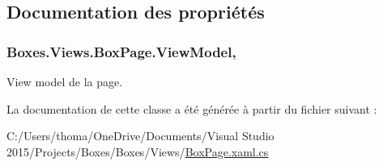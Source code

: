 \subsection{Documentation des propriétés}
\subsubsection[{\texorpdfstring{View\+Model}{ViewModel}}]{ Boxes.\+Views.\+Box\+Page.\+View\+Model\hspace{0.3cm}{\ttfamily [get]}, {\ttfamily [private]}}\hypertarget{class_boxes_1_1_views_1_1_box_page_a43f1ae61e2816252cebc7747a2a350c4}{}\label{class_boxes_1_1_views_1_1_box_page_a43f1ae61e2816252cebc7747a2a350c4}


View model de la page. 



La documentation de cette classe a été générée à partir du fichier suivant \+:\begin{DoxyCompactItemize}
\item 
C\+:/\+Users/thoma/\+One\+Drive/\+Documents/\+Visual Studio 2015/\+Projects/\+Boxes/\+Boxes/\+Views/\hyperlink{_box_page_8xaml_8cs}{Box\+Page.\+xaml.\+cs}\end{DoxyCompactItemize}
